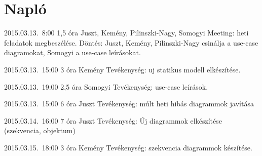 %
\section{Napló}

\begin{naplo}

\bejegyzes
{2015.03.13.~8:00} %
{1,5 óra} %
{Juszt, Kemény, Pilinszki-Nagy, Somogyi} %
{Meeting: heti feladatok megbeszélése. Döntés: Juszt, Kemény, Pilinszki-Nagy csinálja a use-case diagramokat, Somogyi a use-case leírásokat.} %

\bejegyzes
{2015.03.13.~15:00} %
{3 óra} %
{Kemény} %
{Tevékenység: uj statikus modell elkészítése.} %

\bejegyzes
{2015.03.13.~19:00} %
{2,5 óra} %
{Somogyi} %
{Tevékenység: use-case leírások.} %

\bejegyzes
{2015.03.13.~15:00} %
{6 óra} %
{Juszt} %
{Tevékenység: múlt heti hibás diagrammok javítása} %

\bejegyzes
{2015.03.14.~16:00} %
{7 óra} %
{Juszt} %
{Tevékenység: Új diagrammok elkészítése (szekvencia, objektum)} %

\bejegyzes
{2015.03.15.~18:00} %
{3 óra} %
{Kemény} %
{Tevékenység: szekvencia diagrammok készítése.} %

\end{naplo}


